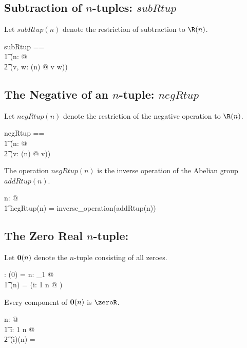 \documentclass{amsart}
\begin{document}
\subsection{Subtraction of $n$-tuples: $subRtup$}

Let $subRtup(n)$ denote the restriction of subtraction to $\Rtup(n)$.

\begin{zed}
subRtup == \\
\t1	(\lambda n: \nat @ \\
\t2		(\lambda v, w: \Rtup(n) @ v \subRinf w))
\end{zed}

\subsection{The Negative of an $n$-tuple: $negRtup$}

Let $negRtup(n)$ denote the restriction of the negative operation to $\Rtup(n)$.

\begin{zed}
negRtup == \\
\t1	(\lambda n: \nat @ \\
\t2		(\lambda v: \Rtup(n) @ \negRinf v))
\end{zed}

\begin{remark}
The operation $negRtup(n)$ is the inverse operation of the Abelian group $addRtup(n)$.

\begin{zed}
\forall n: \nat @ \\
\t1	negRtup(n) = inverse\_operation(addRtup(n))
\end{zed}

\end{remark}


\subsection{The Zero Real $n$-tuple: }

Let $\operatorname{\mathbf{0}}(n)$ denote the $n$-tuple consisting of all zeroes.

\begin{axdef}
	\zeroRtup: \nat \fun \Rinf
\where
	\zeroRtup(0) = \langle \rangle
\also
	\forall n: \nat_1 @ \\
	\t1	\zeroRtup(n) = (\lambda i: 1 \upto n @ \zeroR)
\end{axdef}

\begin{remark}
Every component of $\operatorname{\mathbf{0}}(n)$ is $\zeroR$.

\begin{zed}
\forall n: \nat @ \\
\t1	\forall i: 1 \upto n @ \\
\t2	(\piRinf i)(\zeroRtup n) = \zeroR
\end{zed}

\end{remark}
\end{document}
